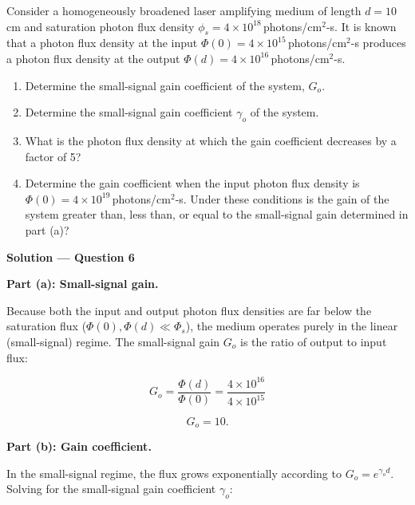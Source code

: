 
\begin{question}[Question 6]Consider a homogeneously broadened laser amplifying medium of length
$d=10$\,cm and saturation photon flux density $\phi_{s}=4\times10^{18}$\,photons/cm$^{2}$-s.
It is known that a photon flux density at the input $\Phi(0)=4\times10^{15}$\,photons/cm$^{2}$-s
produces a photon flux density at the output $\Phi(d)=4\times10^{16}$\,photons/cm$^{2}$-s.

\begin{enumerate}[label=(\alph*)]
  \item Determine the small-signal gain coefficient of the system, $G_{o}$.
  \item Determine the small-signal gain coefficient $\gamma_{o}$ of the system.
  \item What is the photon flux density at which the gain coefficient decreases by a factor of 5?
  \item Determine the gain coefficient when the input photon flux density is
        $\Phi(0)=4\times10^{19}$\,photons/cm$^{2}$-s. Under these conditions is the gain of
        the system greater than, less than, or equal to the small-signal gain determined in
        part (a)?
\end{enumerate}
\end{question}

\textbf{\large Solution --- Question 6}

\textbf{Part (a): Small-signal gain.}

Because both the input and output photon flux densities are far below the saturation flux ($\Phi(0), \Phi(d) \ll \Phi_s$), the medium operates purely in the linear (small-signal) regime. The small-signal gain $G_o$ is the ratio of output to input flux:

\begin{equation*}
  G_o = \frac{\Phi(d)}{\Phi(0)} = \frac{4\times10^{16}}{4\times10^{15}}
\end{equation*}

\begin{equation*}
  \boxed{G_o = 10.}
\end{equation*}

\textbf{Part (b): Gain coefficient.}

In the small-signal regime, the flux grows exponentially according to $G_o = e^{\gamma_o d}$. Solving for the small-signal gain coefficient $\gamma_o$:

